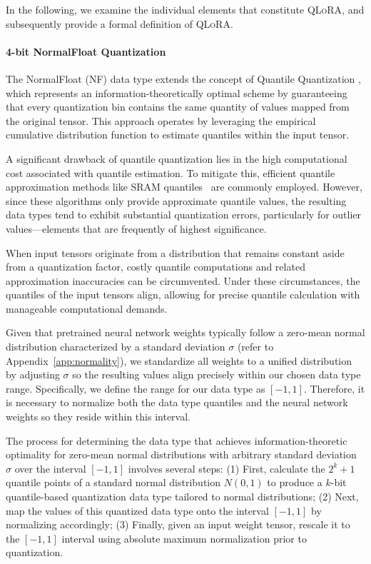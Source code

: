 In the following, we examine the individual elements that constitute \textsc{QLoRA}, and subsequently provide a formal definition of \textsc{QLoRA}.

\paragraph{4-bit NormalFloat Quantization} The NormalFloat (NF) data type extends the concept of Quantile Quantization \citep{dettmers2022optimizers}, which represents an information-theoretically optimal scheme by guaranteeing that every quantization bin contains the same quantity of values mapped from the original tensor. This approach operates by leveraging the empirical cumulative distribution function to estimate quantiles within the input tensor.

A significant drawback of quantile quantization lies in the high computational cost associated with quantile estimation. To mitigate this, efficient quantile approximation methods like SRAM quantiles~\citep{dettmers2022optimizers} are commonly employed. However, since these algorithms only provide approximate quantile values, the resulting data types tend to exhibit substantial quantization errors, particularly for outlier values—elements that are frequently of highest significance.

When input tensors originate from a distribution that remains constant aside from a quantization factor, costly quantile computations and related approximation inaccuracies can be circumvented. Under these circumstances, the quantiles of the input tensors align, allowing for precise quantile calculation with manageable computational demands.

Given that pretrained neural network weights typically follow a zero-mean normal distribution characterized by a standard deviation $\sigma$ (refer to Appendix~\ref{app:normality}), we standardize all weights to a unified distribution by adjusting $\sigma$ so the resulting values align precisely within our chosen data type range. Specifically, we define the range for our data type as $[-1, 1]$. Therefore, it is necessary to normalize both the data type quantiles and the neural network weights so they reside within this interval.

The process for determining the data type that achieves information-theoretic optimality for zero-mean normal distributions with arbitrary standard deviation $\sigma$ over the interval $[-1, 1]$ involves several steps: (1) First, calculate the $2^k+1$ quantile points of a standard normal distribution $N(0, 1)$ to produce a $k$-bit quantile-based quantization data type tailored to normal distributions; (2) Next, map the values of this quantized data type onto the interval $[-1, 1]$ by normalizing accordingly; (3) Finally, given an input weight tensor, rescale it to the $[-1, 1]$ interval using absolute maximum normalization prior to quantization.

